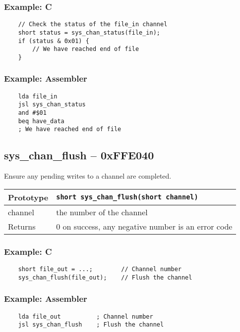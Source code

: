\subsubsection*{Example: C}
\begin{lstlisting}
    // Check the status of the file_in channel
    short status = sys_chan_status(file_in);
    if (status & 0x01) {
        // We have reached end of file
    }
\end{lstlisting}

\subsubsection*{Example: Assembler}
\begin{verbatim}
    lda file_in
    jsl sys_chan_status
    and #$01
    beq have_data
    ; We have reached end of file
\end{verbatim}

\subsection*{sys\_chan\_flush -- 0xFFE040}
Ensure any pending writes to a channel are completed.

\bigskip

\begin{tabular}{|l||l|} \hline
Prototype & \lstinline!short sys_chan_flush(short channel)! \\ \hline
channel & the number of the channel \\ \hline
Returns & 0 on success, any negative number is an error code \\ \hline
\end{tabular}

\subsubsection*{Example: C}
\begin{lstlisting}
    short file_out = ...;        // Channel number
    sys_chan_flush(file_out);    // Flush the channel
\end{lstlisting}

\subsubsection*{Example: Assembler}
\begin{verbatim}
    lda file_out          ; Channel number
    jsl sys_chan_flush    ; Flush the channel
\end{verbatim}

